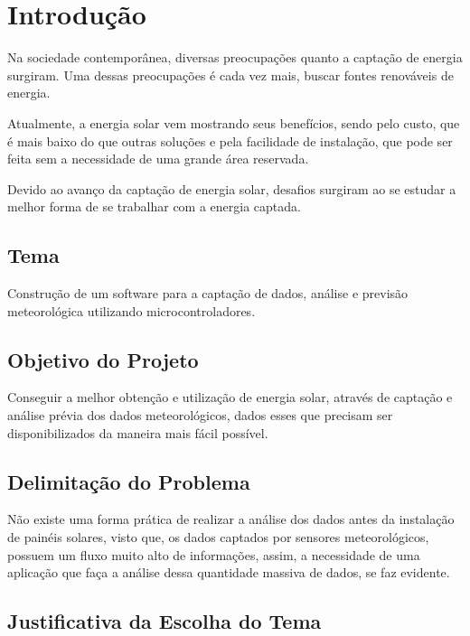 \chapter{Introdução}

Na sociedade contemporânea, diversas preocupações quanto a captação de energia surgiram. Uma dessas preocupações é cada vez mais, buscar fontes renováveis de energia.

Atualmente, a energia solar vem mostrando seus benefícios, sendo pelo custo, que é mais baixo do que outras soluções e pela facilidade de instalação, que pode ser feita sem a necessidade de uma grande área reservada.

Devido ao avanço da captação de energia solar, desafios surgiram ao se estudar a melhor forma de se trabalhar com a energia captada.

\section{Tema}

Construção de um software para a captação de dados, análise e previsão meteorológica utilizando microcontroladores.

\section{Objetivo do Projeto}

Conseguir a melhor obtenção e utilização de energia solar, através de captação e análise prévia dos dados meteorológicos, dados esses que precisam ser disponibilizados da maneira mais fácil possível.

\section{Delimitação do Problema}

Não existe uma forma prática de realizar a análise dos dados antes da instalação de painéis solares, visto que, os dados captados por sensores meteorológicos, possuem um fluxo muito alto de informações, assim, a necessidade de uma aplicação que faça a análise dessa quantidade massiva de dados, se faz evidente.

\section{Justificativa da Escolha do Tema}

